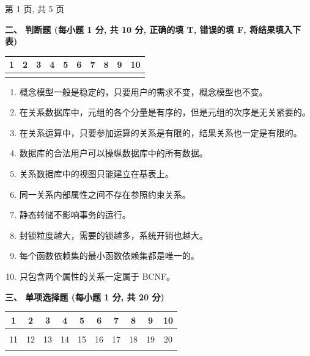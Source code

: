 \documentclass{ctexart} %
\begin{document}
\vfill %
\centering
第 1 页, 共 5 页 %

\clearpage %

\pagestyle{plain}

\raggedright
\textbf{\large 二、 判断题 (每小题 1 分, 共 10 分, 正确的填 T, 错误的填 F, 将结果填入下表)}
\vspace{1em}

\centering
\begin{tabular}{|*{10}{c|}}
\hline
1 & 2 & 3 & 4 & 5 & 6 & 7 & 8 & 9 & 10 \\
\hline
 &  &  &  &  &  &  &  &  &  \\
\hline
\end{tabular}

\vspace{2em}

\begin{enumerate}[label=\arabic*.] %
    \item 概念模型一般是稳定的，只要用户的需求不变，概念模型也不变。
    \item 在关系数据库中，元组的各个分量是有序的，但是元组的次序是无关紧要的。
    \item 在关系运算中，只要参加运算的关系是有限的，结果关系也一定是有限的。
    \item 数据库的合法用户可以操纵数据库中的所有数据。
    \item 关系数据库中的视图只能建立在基表上。
    \item 同一关系内部属性之间不存在参照约束关系。
    \item 静态转储不影响事务的运行。
    \item 封锁粒度越大，需要的锁越多，系统开销也越大。
    \item 每个函数依赖集的最小函数依赖集都是唯一的。
    \item 只包含两个属性的关系一定属于 BCNF。
\end{enumerate}

\vspace{2em}

\raggedright
\textbf{\large 三、 单项选择题 (每小题 1 分, 共 20 分)}
\vspace{1em}

\centering
\begin{tabular}{|*{10}{c|}}
\hline
1 & 2 & 3 & 4 & 5 & 6 & 7 & 8 & 9 & 10 \\
\hline
 &  &  &  &  &  &  &  &  &  \\
\hline
11 & 12 & 13 & 14 & 15 & 16 & 17 & 18 & 19 & 20 \\
\hline
 &  &  &  &  &  &  &  &  &  \\
\hline
\end{tabular}
\end{document}
